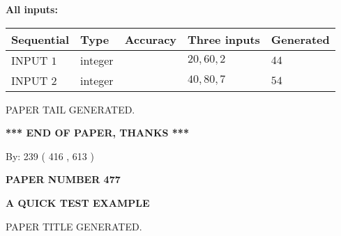 \documentclass[12pt]{article}
\begin{document}
   
   
   
\noindent\vspace{0.1in}\hspace{-0.08in} {\textbf{\Large{All inputs: }}}
   
   
  
  
\noindent\begin{tabular}{|l|l|l|l|l|}
\hline
 Sequential & Type & Accuracy & Three inputs & Generated \\ 
\hline
 
 
  INPUT $  1 $ & integer &  & $
 20
 , 
 60
 , 
 2
 $ & $ 44 $ 
 \\  \hline  
 
 
  INPUT $  2 $ & integer &  & $
 40
 , 
 80
 , 
 7
 $ & $ 54 $ 
 \\  \hline  
 \end{tabular}
   
   
   
   
   
   
 \vspace{0.2in}
 
   
   
\vspace{2.0in} PAPER TAIL GENERATED.
   
   
   
   
\vspace{1.0in} 
{\textbf{\large{ *** END OF PAPER, THANKS *** }}} 
   
   
\hspace{1.0in} By: 
 239 ( 416 ,  613 )
   
   
   
   
\newpage 
\setcounter{page}{ 
   477001 } 
   
   
   
   
 {\textbf{ \Large{ PAPER NUMBER  477  }}}
   
   
\vspace{0.2in}
   
   
   
   
   
   
   
   
 \vspace{0.2in}
{\LARGE {\textbf{ A QUICK TEST EXAMPLE}}}
   
   
 PAPER TITLE GENERATED.
   
   
   
\vspace{0.2in}
   
\end{document}
